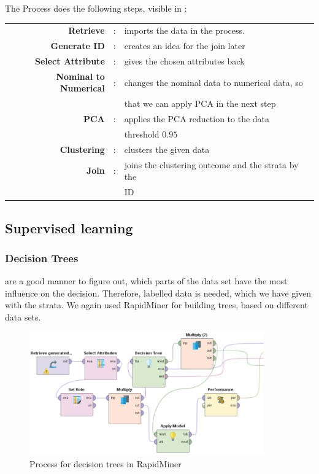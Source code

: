 The Process does the following steps, visible in :

\begin{tabular}{r c l}
	\textbf{Retrieve} & : & imports the data in the process.\\
	\textbf{Generate ID} & : & creates an idea for the join later\\
	\textbf{Select Attribute} & : & gives the chosen attributes back\\
	\textbf{Nominal to Numerical} & : & changes the nominal data to numerical data, so \\
	&&that we can apply PCA in the next step \\
	\textbf{PCA} & : & applies the PCA reduction to the data\\
	&& threshold $0.95$ \\
	\textbf{Clustering} & : &  clusters the given data \\
	\textbf{Join} & : & joins the clustering outcome and the strata by the\\
	&& ID\\
\end{tabular}	
		
		
	\subsection{Supervised learning}
	
	\subsubsection{Decision Trees} are a good manner to figure out, which parts of the data set have the most influence on the decision. Therefore, labelled data is needed, which we have given with the strata. We again used RapidMiner for building trees, based on different data sets. 

	\vspace*{-2em}
	\begin{figure}[H]
		\centering
		\includegraphics[width = 0.9\textwidth]{DecisionTreeRapidModel.PNG}
		\caption{Process for decision trees in RapidMiner}
		\label{fig: RapDec}
		\vspace*{-1.5em}
	\end{figure}
	
